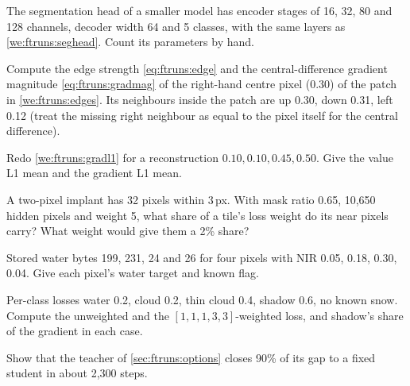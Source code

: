 \begin{checkyourself}
\item\label{ex:ftruns:1} The segmentation head of a smaller model has encoder stages of 16, 32, 80 and 128 channels,
  decoder width 64 and 5 classes, with the same layers as \cref{we:ftruns:seghead}. Count its parameters by hand.
\item\label{ex:ftruns:2} Compute the edge strength \eqref{eq:ftruns:edge} and the central-difference gradient
  magnitude \eqref{eq:ftruns:gradmag} of the right-hand centre pixel (0.30) of the patch in \cref{we:ftruns:edges}. Its
  neighbours inside the patch are up 0.30, down 0.31, left 0.12 (treat the missing right neighbour as equal to the pixel
  itself for the central difference).
\item\label{ex:ftruns:3} Redo \cref{we:ftruns:gradl1} for a reconstruction $0.10, 0.10, 0.45, 0.50$. Give the value L1
  mean and the gradient L1 mean.
\item\label{ex:ftruns:4} A two-pixel implant has 32 pixels within 3\,px. With mask ratio 0.65, 10,650 hidden pixels and
  weight 5, what share of a tile's loss weight do its near pixels carry? What weight would give them a 2\% share?
\item\label{ex:ftruns:5} Stored water bytes 199, 231, 24 and 26 for four pixels with NIR 0.05, 0.18, 0.30, 0.04. Give
  each pixel's water target and known flag.
\item\label{ex:ftruns:6} Per-class losses water 0.2, cloud 0.2, thin cloud 0.4, shadow 0.6, no known snow. Compute the
  unweighted and the $[1, 1, 1, 3, 3]$-weighted loss, and shadow's share of the gradient in each case.
\item\label{ex:ftruns:7} Show that the teacher of \cref{sec:ftruns:options} closes 90\% of its gap to a fixed student
  in about 2,300 steps.
\end{checkyourself}
\endgroup

